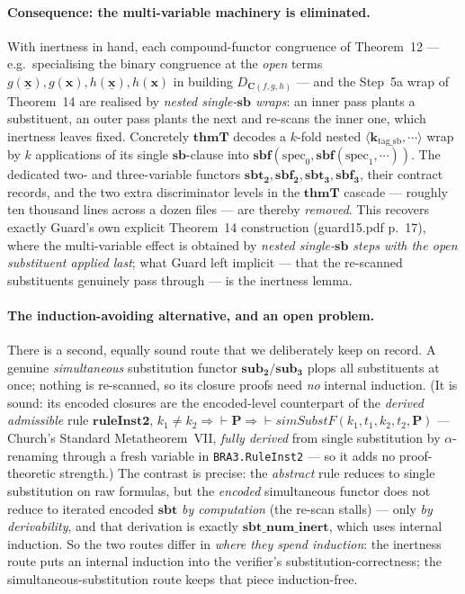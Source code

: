 \documentclass[11pt]{article}
\theoremstyle{plain}
\theoremstyle{definition}
\theoremstyle{remark}
\newcommand{\sbf}{\mathbf{sbf}}
\newcommand{\sbt}{\mathbf{sbt}}
\newcommand{\sbftwo}{\mathbf{sbf_2}}
\newcommand{\sbttwo}{\mathbf{sbt_2}}
\newcommand{\subtwo}{\mathbf{sub_2}}
\newcommand{\thmT}{\mathbf{thmT}}
\newcommand{\seq}[1]{\langle #1 \rangle}
\begin{document}
\paragraph{Consequence: the multi-variable machinery is eliminated.}  With
inertness in hand, each compound-functor congruence of Theorem~12 --- e.g.\
specialising the binary congruence at the \emph{open} terms
$g(\underline{\mathbf{x}}), g(\mathbf{x}), h(\underline{\mathbf{x}}),
h(\mathbf{x})$ in building $D_{\mathbf{C}(f,g,h)}$ --- and the Step~5a wrap of
Theorem~14 are realised by \emph{nested single-$\mathbf{sb}$ wraps}: an inner
pass plants a substituent, an outer pass plants the next and re-scans the
inner one, which inertness leaves fixed.  Concretely $\thmT$ decodes a
$k$-fold nested $\seq{\mathbf{k}_{\mathrm{tag\_sb}}, \cdots}$ wrap by $k$
applications of its single $\mathbf{sb}$-clause into
$\sbf(\mathrm{spec}_0,\sbf(\mathrm{spec}_1,\cdots))$.  The dedicated two- and
three-variable functors $\sbttwo,\sbftwo,\mathbf{sbt_3},\mathbf{sbf_3}$, their
contract records, and the two extra discriminator levels in the $\thmT$
cascade --- roughly ten thousand lines across a dozen files --- are thereby
\emph{removed}.  This recovers exactly Guard's own explicit Theorem~14
construction (guard15.pdf p.~17), where the multi-variable effect is obtained
by \emph{nested single-$\mathbf{sb}$ steps with the open substituent applied
last}; what Guard left implicit --- that the re-scanned substituents
genuinely pass through --- is the inertness lemma.

\paragraph{The induction-avoiding alternative, and an open problem.}  There
is a second, equally sound route that we deliberately keep on record.  A
genuine \emph{simultaneous} substitution functor $\subtwo/\mathbf{sub_3}$
plops all substituents at once; nothing is re-scanned, so its closure proofs
need \emph{no} internal induction.  (It is sound: its encoded closures are
the encoded-level counterpart of the \emph{derived admissible} rule
$\mathbf{ruleInst2}$, $k_1\neq k_2 \Rightarrow {\vdash}\mathbf{P} \Rightarrow
{\vdash}\mathit{simSubstF}(k_1,t_1,k_2,t_2,\mathbf{P})$ --- Church's Standard
Metatheorem~VII, \emph{fully derived} from single substitution by
$\alpha$-renaming through a fresh variable in \verb|BRA3.RuleInst2| --- so it
adds no proof-theoretic strength.)  The contrast is precise: the
\emph{abstract} rule reduces to single substitution on raw formulas, but the
\emph{encoded} simultaneous functor does not reduce to iterated encoded
$\sbt$ \emph{by computation} (the re-scan stalls) --- only \emph{by
derivability}, and that derivation is exactly $\mathbf{sbt\_num\_inert}$,
which uses internal induction.  So the two routes differ in \emph{where they
spend induction}: the inertness route puts an internal induction into the
verifier's substitution-correctness; the simultaneous-substitution route
keeps that piece induction-free.
\end{document}
